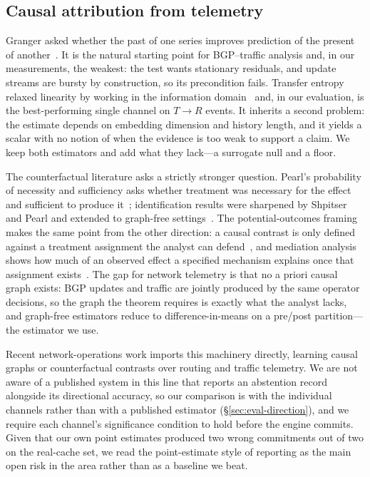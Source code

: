 \subsection{Causal attribution from telemetry}

Granger asked whether the past of one series improves prediction of the
present of another~\cite{granger-1969-investigating}. It is the natural
starting point for BGP--traffic analysis and, in our measurements, the
weakest: the test wants stationary residuals, and update streams are
bursty by construction, so its precondition fails. Transfer entropy
relaxed linearity by working in the information domain~\cite{schreiber-2000-te,barnett-2009-granger-network}
and, in our evaluation, is the best-performing single channel on
$T\to R$ events. It inherits a second problem: the estimate depends on
embedding dimension and history length, and it yields a scalar with no
notion of when the evidence is too weak to support a claim. We keep both
estimators and add what they lack---a surrogate null and a floor.

The counterfactual literature asks a strictly stronger question.
Pearl's probability of necessity and sufficiency asks whether treatment
was necessary for the effect and sufficient to produce
it~\cite{pearl-causality-2009,pearl1999}; identification results were
sharpened by Shpitser and Pearl and extended to graph-free
settings~\cite{shpitser-2008-pns,pearl-2014-pns-3}. The potential-outcomes
framing makes the same point from the other direction: a causal contrast
is only defined against a treatment assignment the analyst can
defend~\cite{rubin-2005-causal}, and mediation analysis shows how much of
an observed effect a specified mechanism explains once that assignment
exists~\cite{imai-2010-mediation}. The gap for network telemetry is that
no a priori causal graph exists: BGP updates and traffic are jointly
produced by the same operator decisions, so the graph the theorem requires
is exactly what the analyst lacks, and graph-free estimators reduce to
difference-in-means on a pre/post partition---the estimator we use.

Recent network-operations work imports this machinery directly, learning
causal graphs or counterfactual contrasts over routing and traffic
telemetry. We are not aware of a published system in this line that
reports an abstention record alongside its directional accuracy, so our
comparison is with the individual channels rather than with a published
estimator (\S\ref{sec:eval-direction}), and we require each channel's
significance condition to hold before the engine commits. Given that our
own point estimates produced two wrong commitments out of two on the
real-cache set, we read the point-estimate style of reporting as the main
open risk in the area rather than as a baseline we beat.

